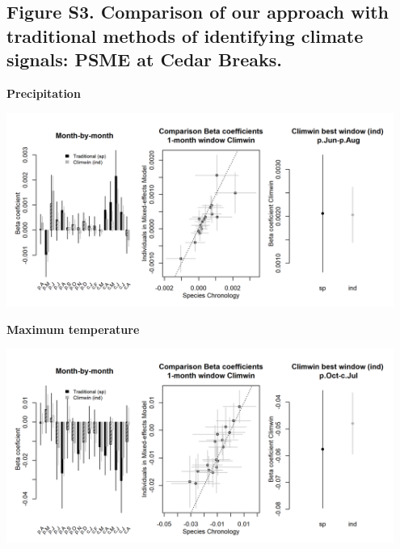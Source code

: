 \documentclass[
]{article}
\begin{document}
\newpage

\hypertarget{figure-s3.-comparison-of-our-approach-with-traditional-methods-of-identifying-climate-signals-psme-at-cedar-breaks.}{%
\subsection{Figure S3. Comparison of our approach with traditional
methods of identifying climate signals: PSME at Cedar
Breaks.}\label{figure-s3.-comparison-of-our-approach-with-traditional-methods-of-identifying-climate-signals-psme-at-cedar-breaks.}}

\textbf{Precipitation}

\includegraphics[width=0.95\textwidth,height=\textheight]{tables_figures/SI_figures/traditional_comparison/climwin_vs_dcc_CedarBreaks_PSME_pre.png}

\textbf{Maximum temperature}

\includegraphics[width=0.95\textwidth,height=\textheight]{tables_figures/SI_figures/traditional_comparison/climwin_vs_dcc_CedarBreaks_PSME_tmx.png}
\end{document}

